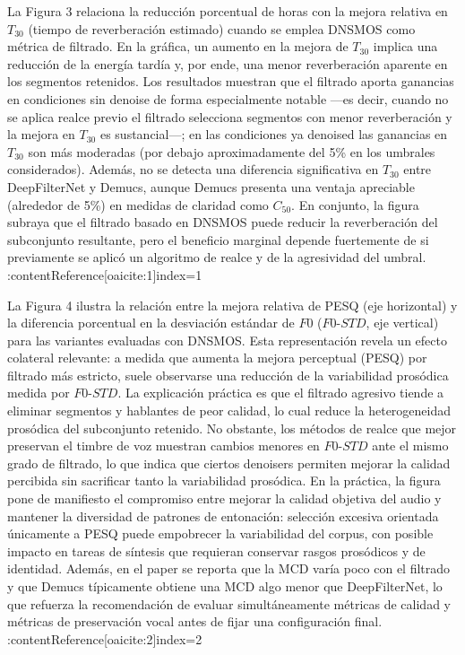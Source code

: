 La Figura 3 relaciona la reducción porcentual de horas con la mejora relativa en \(T_{30}\) (tiempo de reverberación estimado) cuando se emplea DNSMOS como métrica de filtrado. En la gráfica, un aumento en la mejora de \(T_{30}\) implica una reducción de la energía tardía y, por ende, una menor reverberación aparente en los segmentos retenidos. Los resultados muestran que el filtrado aporta ganancias en condiciones sin denoise de forma especialmente notable —es decir, cuando no se aplica realce previo el filtrado selecciona segmentos con menor reverberación y la mejora en \(T_{30}\) es sustancial—; en las condiciones ya denoised las ganancias en \(T_{30}\) son más moderadas (por debajo aproximadamente del 5\% en los umbrales considerados). Además, no se detecta una diferencia significativa en \(T_{30}\) entre DeepFilterNet y Demucs, aunque Demucs presenta una ventaja apreciable (alrededor de 5\%) en medidas de claridad como \(C_{50}\). En conjunto, la figura subraya que el filtrado basado en DNSMOS puede reducir la reverberación del subconjunto resultante, pero el beneficio marginal depende fuertemente de si previamente se aplicó un algoritmo de realce y de la agresividad del umbral. :contentReference[oaicite:1]{index=1}


La Figura 4 ilustra la relación entre la mejora relativa de PESQ (eje horizontal) y la diferencia porcentual en la desviación estándar de \(F0\) (\(F0\text{-}STD\), eje vertical) para las variantes evaluadas con DNSMOS. Esta representación revela un efecto colateral relevante: a medida que aumenta la mejora perceptual (PESQ) por filtrado más estricto, suele observarse una reducción de la variabilidad prosódica medida por \(F0\text{-}STD\). La explicación práctica es que el filtrado agresivo tiende a eliminar segmentos y hablantes de peor calidad, lo cual reduce la heterogeneidad prosódica del subconjunto retenido. No obstante, los métodos de realce que mejor preservan el timbre de voz muestran cambios menores en \(F0\text{-}STD\) ante el mismo grado de filtrado, lo que indica que ciertos denoisers permiten mejorar la calidad percibida sin sacrificar tanto la variabilidad prosódica. En la práctica, la figura pone de manifiesto el compromiso entre mejorar la calidad objetiva del audio y mantener la diversidad de patrones de entonación: selección excesiva orientada únicamente a PESQ puede empobrecer la variabilidad del corpus, con posible impacto en tareas de síntesis que requieran conservar rasgos prosódicos y de identidad. Además, en el paper se reporta que la MCD varía poco con el filtrado y que Demucs típicamente obtiene una MCD algo menor que DeepFilterNet, lo que refuerza la recomendación de evaluar simultáneamente métricas de calidad y métricas de preservación vocal antes de fijar una configuración final. :contentReference[oaicite:2]{index=2}



